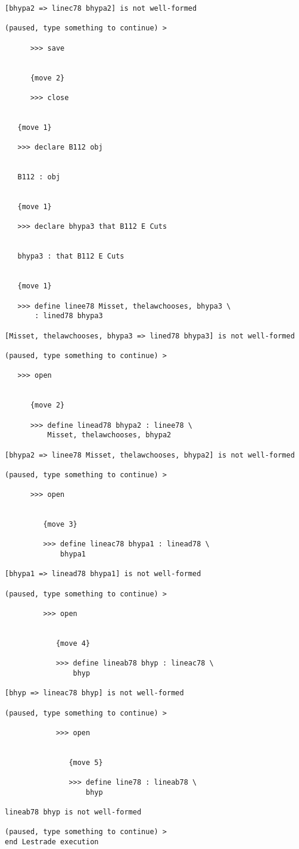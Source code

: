 \documentclass[12pt]{article}
\begin{document}
\begin{verbatim}
[bhypa2 => linec78 bhypa2] is not well-formed

(paused, type something to continue) >

      >>> save


      {move 2}

      >>> close


   {move 1}

   >>> declare B112 obj


   B112 : obj


   {move 1}

   >>> declare bhypa3 that B112 E Cuts


   bhypa3 : that B112 E Cuts


   {move 1}

   >>> define linee78 Misset, thelawchooses, bhypa3 \
       : lined78 bhypa3

[Misset, thelawchooses, bhypa3 => lined78 bhypa3] is not well-formed

(paused, type something to continue) >

   >>> open


      {move 2}

      >>> define linead78 bhypa2 : linee78 \
          Misset, thelawchooses, bhypa2

[bhypa2 => linee78 Misset, thelawchooses, bhypa2] is not well-formed

(paused, type something to continue) >

      >>> open


         {move 3}

         >>> define lineac78 bhypa1 : linead78 \
             bhypa1

[bhypa1 => linead78 bhypa1] is not well-formed

(paused, type something to continue) >

         >>> open


            {move 4}

            >>> define lineab78 bhyp : lineac78 \
                bhyp

[bhyp => lineac78 bhyp] is not well-formed

(paused, type something to continue) >

            >>> open


               {move 5}

               >>> define line78 : lineab78 \
                   bhyp

lineab78 bhyp is not well-formed

(paused, type something to continue) >
end Lestrade execution
\end{verbatim}
\end{document}
